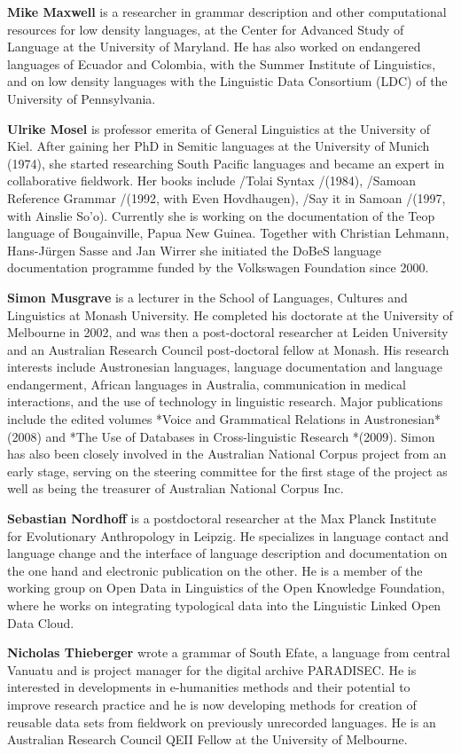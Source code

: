 \textbf{Mike Maxwell} is a researcher in grammar description and other computational
resources for low density languages, at the Center for Advanced Study of
Language at the University of Maryland. He has also worked on endangered
languages of Ecuador and Colombia, with the Summer Institute of
Linguistics, and on low density languages with the Linguistic Data
Consortium (LDC) of the University of Pennsylvania.


\textbf{Ulrike Mosel} is professor emerita of General Linguistics at the University of Kiel. After gaining her PhD in Semitic languages at the University of Munich (1974), she started researching South Pacific languages and became an expert in collaborative fieldwork. Her books include /Tolai Syntax /(1984), /Samoan Reference Grammar /(1992, with Even Hovdhaugen), /Say it in Samoan /(1997, with Ainslie So'o). Currently she is working on the documentation of the Teop language of Bougainville, Papua New Guinea. Together with Christian Lehmann, Hans-Jürgen Sasse and Jan Wirrer she initiated the DoBeS language documentation programme funded by the Volkswagen Foundation since 2000.
 


\textbf{Simon Musgrave} is a lecturer in the School of Languages, Cultures and
Linguistics at Monash University. He completed his doctorate at the
University of Melbourne in 2002, and was then a post-doctoral researcher at
Leiden University and an Australian Research Council post-doctoral fellow
at Monash.  His research interests include Austronesian languages, language
documentation and language endangerment, African languages in Australia,
communication in medical interactions, and the use of technology in
linguistic research. Major publications include the edited volumes *Voice
and Grammatical Relations in Austronesian* (2008) and *The Use of Databases
in Cross-linguistic Research *(2009). Simon has also been closely involved
in the Australian National Corpus project from an early stage, serving on
the steering committee for the first stage of the project as well as being
the treasurer of Australian National Corpus Inc.

\textbf{Sebastian Nordhoff}  is a postdoctoral researcher at the Max Planck Institute for Evolutionary Anthropology in Leipzig. He specializes in language contact and language change and the interface of language description and documentation on the one hand and electronic publication on the other. He is a member of the working group on Open Data in Linguistics of the Open Knowledge Foundation, where he works on integrating typological data into the Linguistic Linked Open Data Cloud. 


\textbf{Nicholas Thieberger} wrote a grammar of South Efate, a language from
central Vanuatu and is project manager for the digital archive
PARADISEC. He is interested in developments in e-humanities methods
and their potential to improve research practice and he is now
developing methods for creation of reusable data sets from fieldwork
on previously unrecorded languages. He is an Australian Research
Council QEII Fellow at the University of Melbourne.



